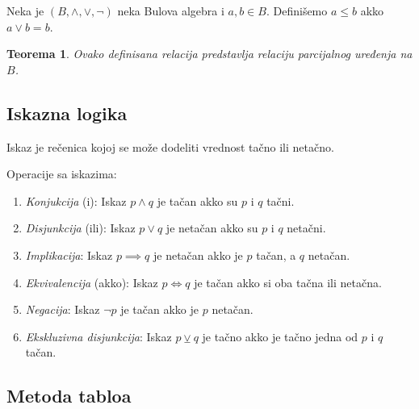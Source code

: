 \documentclass[12p,14paper]{article}
\newtheorem*{theorem}{Teorema}
\begin{document}
\begin{multicols}{2}
    Neka je $(B, \land, \lor, \neg)$ neka Bulova algebra i $a,b \in B$. 
    Definišemo $a \leq b$ akko $a \lor b = b$.

    \begin{theorem}
        Ovako definisana relacija predstavlja relaciju parcijalnog uređenja
        na $B$.
    \end{theorem}

\subsection{Iskazna logika}

    Iskaz je rečenica kojoj se može dodeliti vrednost tačno ili netačno.

    Operacije sa iskazima:
    \begin{enumerate}
        \itemsep0em
        \item \textit{Konjukcija} (i): Iskaz $p \land q$ je tačan akko su 
            $p$ i $q$ tačni.
        \item \textit{Disjunkcija} (ili): Iskaz $p \lor q$ je netačan akko
            su $p$ i $q$ netačni.
        \item \textit{Implikacija}: Iskaz $p \implies q$ je netačan akko
            je $p$ tačan, a $q$ netačan.
        \item \textit{Ekvivalencija} (akko): Iskaz $p \iff q$ je tačan akko 
            si oba tačna ili netačna.
        \item \textit{Negacija}: Iskaz $\neg p$ je tačan akko je $p$ netačan.
        \item \textit{Ekskluzivna disjunkcija}: Iskaz $p \veebar q$ je tačno
            akko je tačno jedna od $p$ i $q$ tačan.
    \end{enumerate}

\subsection{Metoda tabloa}

\end{multicols}
\end{document}

